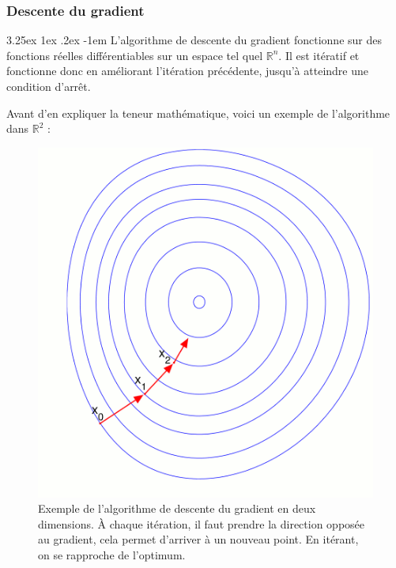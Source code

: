 \documentclass[a4paper, 11pt]{article}
\makeatletter
\renewcommand\paragraph{\@startsection{paragraph}{5}{\z@}%
  {3.25ex \@plus1ex \@minus.2ex}%
  {-1em}%
  {\normalfont\normalsize\bfseries}}
\makeatother
\begin{document}
\subsubsection{Descente du gradient}\label{section descente du gradient}
\paragraph{}
L'algorithme de descente du gradient fonctionne sur des fonctions réelles différentiables sur un espace tel quel $\mathbb{R}^n$. Il est itératif et fonctionne donc en améliorant l'itération précédente, jusqu'à atteindre une condition d'arrêt.

Avant d'en expliquer la teneur mathématique, voici un exemple de l'algorithme dans $\mathbb{R}^2$ :

\begin{figure}[H]
\centering
\includegraphics[scale=0.40]{images/descente_gradient_exemple}
\caption[]{Exemple de l'algorithme de descente du gradient en deux dimensions. À chaque itération, il faut prendre la direction opposée au gradient\footnotemark, cela permet d'arriver à un nouveau point. En itérant, on se rapproche de l'optimum. }
\end{figure}

\end{document}
